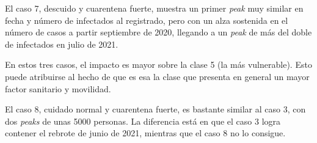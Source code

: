 El caso 7, descuido y cuarentena fuerte, muestra un primer \textit{peak} muy similar en fecha y número de infectados al registrado, pero con un alza sostenida en el número de casos a partir septiembre de 2020, llegando a un \textit{peak} de más del doble de infectados en julio de 2021.

En estos tres casos, el impacto es mayor sobre la clase 5 (la más vulnerable). Esto puede atribuirse al hecho de que es esa la clase que presenta en general un mayor factor sanitario y movilidad.

El caso 8, cuidado normal y cuarentena fuerte, es bastante similar al caso 3, con dos \textit{peaks} de unas 5000 personas. La diferencia está en que el caso 3 logra contener el rebrote de junio de 2021, mientras que el caso 8 no lo consigue.


